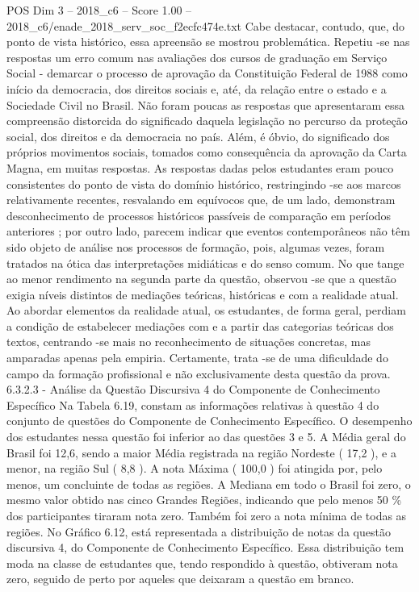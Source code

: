 \begin{textsample}{POS Dim 3 – 2018\_c6 – Score 1.00 – 2018\_c6/enade\_2018\_serv\_soc\_f2ecfc474e.txt}
Cabe destacar, contudo, que, do ponto de vista histórico, essa apreensão se mostrou problemática.
Repetiu -se nas respostas um erro comum nas avaliações dos cursos de graduação em Serviço Social - demarcar o processo de aprovação da Constituição Federal de 1988 como início da democracia, dos direitos sociais e, até, da relação entre o estado e a Sociedade Civil no Brasil.
Não foram poucas as respostas que apresentaram essa compreensão distorcida do significado daquela legislação no percurso da proteção social, dos direitos e da democracia no país.
Além, é óbvio, do significado dos próprios movimentos sociais, tomados como consequência da aprovação da Carta Magna, em muitas respostas.
As respostas dadas pelos estudantes eram pouco consistentes do ponto de vista do domínio histórico, restringindo -se aos marcos relativamente recentes, resvalando em equívocos que, de um lado, demonstram desconhecimento de processos históricos passíveis de comparação em períodos anteriores ; por outro lado, parecem indicar que eventos contemporâneos não têm sido objeto de análise nos processos de formação, pois, algumas vezes, foram tratados na ótica das interpretações midiáticas e do senso comum.
No que tange ao menor rendimento na segunda parte da questão, observou -se que a questão exigia níveis distintos de mediações teóricas, históricas e com a realidade atual.
Ao abordar elementos da realidade atual, os estudantes, de forma geral, perdiam a condição de estabelecer mediações com e a partir das categorias teóricas dos textos, centrando -se mais no reconhecimento de situações concretas, mas amparadas apenas pela empiria.
Certamente, trata -se de uma dificuldade do campo da formação profissional e não exclusivamente desta questão da prova. 6.3.2.3 - Análise da Questão Discursiva 4 do Componente de Conhecimento Específico Na Tabela 6.19, constam as informações relativas à questão 4 do conjunto de questões do Componente de Conhecimento Específico.
O desempenho dos estudantes nessa questão foi inferior ao das questões 3 e 5.
A Média geral do Brasil foi 12,6, sendo a maior Média registrada na região Nordeste ( 17,2 ), e a menor, na região Sul ( 8,8 ).
A nota Máxima ( 100,0 ) foi atingida por, pelo menos, um concluinte de todas as regiões.
A Mediana em todo o Brasil foi zero, o mesmo valor obtido nas cinco Grandes Regiões, indicando que pelo menos 50 \% dos participantes tiraram nota zero.
Também foi zero a nota mínima de todas as regiões.
No Gráfico 6.12, está representada a distribuição de notas da questão discursiva 4, do Componente de Conhecimento Específico.
Essa distribuição tem moda na classe de estudantes que, tendo respondido à questão, obtiveram nota zero, seguido de perto por aqueles que deixaram a questão em branco.

\end{textsample}
